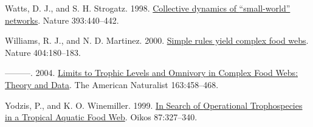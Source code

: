 \documentclass[
]{article}
\newlength{\cslhangindent}
\newenvironment{CSLReferences}[2] %
 {\begin{list}{}{%
  \setlength{\itemindent}{0pt}
  \setlength{\leftmargin}{0pt}
  \setlength{\parsep}{0pt}
  \ifodd #1
   \setlength{\leftmargin}{\cslhangindent}
   \setlength{\itemindent}{-1\cslhangindent}
  \fi
  \setlength{\itemsep}{#2\baselineskip}}}
 {\end{list}}
\begin{document}
\begin{CSLReferences}{0}{0}
Watts, D. J., and S. H. Strogatz. 1998.
\href{https://doi.org/10.1038/30918}{Collective dynamics of
{``small-world''} networks}. Nature 393:440--442.

Williams, R. J., and N. D. Martinez. 2000.
\href{https://doi.org/10.1038/35004572}{Simple rules yield complex food
webs}. Nature 404:180--183.

---------. 2004. \href{https://doi.org/10.1086/381964}{Limits to
{Trophic Levels} and {Omnivory} in {Complex Food Webs}: {Theory} and
{Data}}. The American Naturalist 163:458--468.

Yodzis, P., and K. O. Winemiller. 1999.
\href{https://doi.org/10.2307/3546748}{In {Search} of {Operational
Trophospecies} in a {Tropical Aquatic Food Web}}. Oikos 87:327--340.

\end{CSLReferences}
\end{document}
